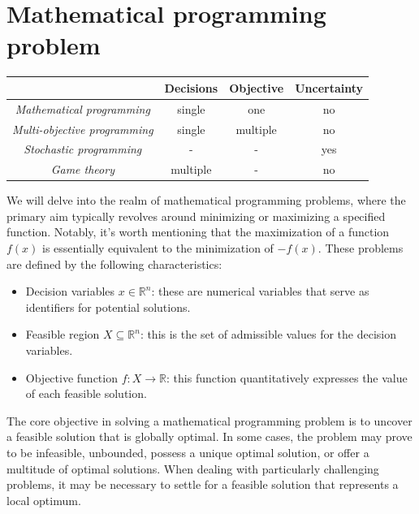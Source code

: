 \documentclass[12pt, a4paper]{report}
\begin{document}
    \section{Mathematical programming problem}
    \begin{table}[H]
        \centering
        \begin{tabular}{c|ccc|}
        \cline{2-4}
                                                                   & \textbf{Decisions} & \textbf{Objective} & \textbf{Uncertainty} \\ \hline
        \multicolumn{1}{|c|}{\textit{Mathematical programming}}    & single                   & one                          & no                   \\
        \multicolumn{1}{|c|}{\textit{Multi-objective programming}} & single                   & multiple                     & no                   \\
        \multicolumn{1}{|c|}{\textit{Stochastic programming}}      & -                        & -                            & yes                  \\
        \multicolumn{1}{|c|}{\textit{Game theory}}                 & multiple                 & -                            & no                   \\ \hline
        \end{tabular}
    \end{table}
    We will delve into the realm of mathematical programming problems, where the primary aim typically revolves around minimizing or maximizing a specified function. 
    Notably, it's worth mentioning that the maximization of a function $f(x)$ is essentially equivalent to the minimization of $-f(x)$. 
    These problems are defined by the following characteristics:
    \begin{itemize}
        \item Decision variables $x \in \mathbb{R}^n$: these are numerical variables that serve as identifiers for potential solutions.
        \item Feasible region $X \subseteq \mathbb{R}^n$: this is the set of admissible values for the decision variables.
        \item Objective function $f:X \rightarrow\mathbb{R}$: this function quantitatively expresses the value of each feasible solution.
    \end{itemize}
    The core objective in solving a mathematical programming problem is to uncover a feasible solution that is globally optimal. 
    In some cases, the problem may prove to be infeasible, unbounded, possess a unique optimal solution, or offer a multitude of optimal solutions. 
    When dealing with particularly challenging problems, it may be necessary to settle for a feasible solution that represents a local optimum.
    
\end{document}
